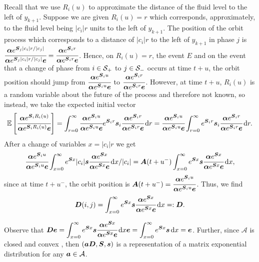 Recall that we use \(R_i(u)\) to approximate the distance of the fluid level to the left of \(y_{k+1}\). Suppose we are given \(R_i(u)=r\) which corresponds, approximately, to the fluid level being \(|c_i|r\) units to the left of \(y_{k+1}\). The position of the orbit process which corresponds to a distance of \(|c_i|r\) to the left of \(y_{k+1}\) in phase \(j\) is \(\cfrac{\boldsymbol\alpha e^{ \boldsymbol S_j|c_i|r/|c_j| } }{\boldsymbol\alpha e^{\boldsymbol S_j |c_i|r/|c_j| } \boldsymbol e}=\cfrac{\boldsymbol\alpha e^{ \boldsymbol S_ir } }{\boldsymbol\alpha e^{\boldsymbol S_ir } \boldsymbol e}\). Hence, on \(R_i(u)=r\), the event \(E\) and on the event that a change of phase from \(i\in\mathcal{S}_+\) to \(j\in\mathcal{S}_-\) occurs at time \(t+u\), the orbit position should jump from \(\cfrac{\boldsymbol\alpha e^{\boldsymbol S_iu} }{\boldsymbol\alpha e^{\boldsymbol S_iu } \boldsymbol e}\) to \(\cfrac{\boldsymbol\alpha e^{ \boldsymbol S_ir } }{\boldsymbol\alpha e^{\boldsymbol S_ir } \boldsymbol e}\). However, at time \(t+u\), \(R_i(u)\) is a random variable about the future of the process and therefore not known, so instead, we take the expected initial vector 
\[\mathbb E \left[ \cfrac{\boldsymbol\alpha e^{ \boldsymbol S_iR_i(u) } }{\boldsymbol\alpha e^{\boldsymbol S_iR_i(u) } \boldsymbol e} \right] = \int_{r=0}^\infty \cfrac{\boldsymbol\alpha e^{\boldsymbol S_i u } }{\boldsymbol\alpha e^{\boldsymbol S_iu } \boldsymbol e} e^{\boldsymbol S_ir } \boldsymbol s_i \cfrac{\boldsymbol\alpha e^{ \boldsymbol S_ir } }{\boldsymbol\alpha e^{ \boldsymbol S_ir } \boldsymbol e}\, \mathrm{d} r = \cfrac{\boldsymbol\alpha e^{\boldsymbol S_i u } }{\boldsymbol\alpha e^{\boldsymbol S_iu } \boldsymbol e} \int_{r=0}^\infty e^{\boldsymbol S_ir } \boldsymbol s_i\cfrac{\boldsymbol\alpha e^{ \boldsymbol S_ir } }{\boldsymbol\alpha e^{ \boldsymbol S_ir } \boldsymbol e}\, \mathrm{d} r.\]
After a change of variables \(x=|c_i|r\) we get 
\[\cfrac{\boldsymbol\alpha e^{\boldsymbol S_i u } }{\boldsymbol\alpha e^{\boldsymbol S_iu } \boldsymbol e} \int_{x=0}^\infty e^{\boldsymbol S x }|c_i| \boldsymbol s \cfrac{\boldsymbol\alpha e^{ \boldsymbol Sx } }{\boldsymbol\alpha e^{ \boldsymbol Sx } \boldsymbol e}\, \mathrm{d} x/|c_i| = \boldsymbol A(t+u^-)\int_{x=0}^\infty e^{\boldsymbol S x }\boldsymbol s \cfrac{\boldsymbol\alpha e^{ \boldsymbol Sx } }{\boldsymbol\alpha e^{ \boldsymbol Sx } \boldsymbol e}\, \mathrm{d} x,\]
since at time \(t+u^-\), the orbit position is \(\boldsymbol A(t+u^-) = \cfrac{\boldsymbol\alpha e^{\boldsymbol S_i u } }{\boldsymbol\alpha e^{\boldsymbol S_iu } \boldsymbol e}\). Thus, we find 
\[\boldsymbol D(i,j)=\displaystyle \int_{x=0}^\infty e^{\boldsymbol S x }\boldsymbol s \cfrac{\boldsymbol\alpha e^{ \boldsymbol Sx } }{\boldsymbol\alpha e^{ \boldsymbol Sx } \boldsymbol e}\, \mathrm{d} x=:\boldsymbol D.\]

Observe that \(\boldsymbol D\boldsymbol e = \displaystyle \int_{x=0}^\infty e^{\boldsymbol S x }\boldsymbol s \cfrac{\boldsymbol\alpha e^{ \boldsymbol Sx } }{\boldsymbol\alpha e^{ \boldsymbol Sx } \boldsymbol e}\, \mathrm{d} x\boldsymbol e =\displaystyle \int_{x=0}^\infty e^{\boldsymbol S x }\boldsymbol s \, \mathrm{d} x=\boldsymbol e\). Further, since \(\mathcal A\) is closed and convex \citep{MEinAP}, then \((\boldsymbol a \boldsymbol D,\boldsymbol S,\boldsymbol s)\) is a representation of a matrix exponential distribution for any \(\boldsymbol a\in\mathcal A\). 

